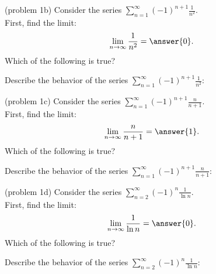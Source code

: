 \documentclass[handout]{ximera}
\begin{document}
\begin{problem}(problem 1b)
Consider the series $\displaystyle{\sum_{n=1}^\infty (-1)^{n+1} \frac{1}{n^2}}$.\\
First, find the limit:
\[
\lim_{n\to\infty} \frac{1}{n^2} = \answer{0}.
\]
Which of the following is true?
\begin{multipleChoice}
\end{multipleChoice}


Describe the behavior of the series $\displaystyle{\sum_{n=1}^\infty (-1)^{n+1} \frac{1}{n^2}:}$
\begin{multipleChoice}
\end{multipleChoice}

\end{problem}



\begin{problem}(problem 1c)
Consider the series $\displaystyle{\sum_{n=1}^\infty (-1)^{n+1} \frac{n}{n+1}}$.\\
First, find the limit:
\[
\lim_{n\to\infty} \frac{n}{n+1} = \answer{1}.
\]
Which of the following is true?
\begin{multipleChoice}
\end{multipleChoice}


Describe the behavior of the series $\displaystyle{\sum_{n=1}^\infty (-1)^{n+1} \frac{n}{n+1}:}$
\begin{multipleChoice}
\end{multipleChoice}

\end{problem}


\begin{problem}(problem 1d)
Consider the series $\displaystyle{\sum_{n=2}^\infty (-1)^n \frac{1}{\ln n}}$.\\
First, find the limit:
\[
\lim_{n\to\infty} \frac{1}{\ln n} = \answer{0}.
\]
Which of the following is true?
\begin{multipleChoice}
\end{multipleChoice}


Describe the behavior of the series $\displaystyle{\sum_{n=2}^\infty (-1)^n \frac{1}{\ln n}:}$
\begin{multipleChoice}
\end{multipleChoice}

\end{problem}
\end{document}
